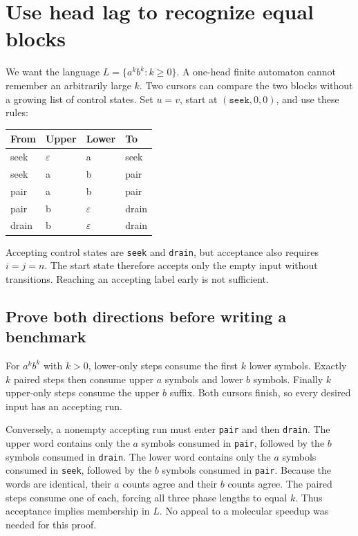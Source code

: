 \section{Use head lag to recognize equal blocks}
We want the language $L=\{a^k b^k:k\geq0\}$. A one-head finite automaton
cannot remember an arbitrarily large $k$. Two cursors can compare the two
blocks without a growing list of control states. Set $u=v$, start at
$(\texttt{seek},0,0)$, and use these rules:
\begin{center}
\begin{tabular}{llll}\toprule
From & Upper & Lower & To\\\midrule
seek & $\varepsilon$ & a & seek\\
seek & a & b & pair\\
pair & a & b & pair\\
pair & b & $\varepsilon$ & drain\\
drain & b & $\varepsilon$ & drain\\\bottomrule
\end{tabular}\end{center}
Accepting control states are \texttt{seek} and \texttt{drain}, but acceptance
also requires $i=j=n$. The start state therefore accepts only the empty input
without transitions. Reaching an accepting label early is not sufficient.


\subsection{Prove both directions before writing a benchmark}
For $a^k b^k$ with $k>0$, lower-only steps consume the first $k$ lower
symbols. Exactly $k$ paired steps then consume upper $a$ symbols and lower
$b$ symbols. Finally $k$ upper-only steps consume the upper $b$ suffix.
Both cursors finish, so every desired input has an accepting run.

Conversely, a nonempty accepting run must enter \texttt{pair} and then
\texttt{drain}. The upper word contains only the $a$ symbols consumed in
\texttt{pair}, followed by the $b$ symbols consumed in \texttt{drain}.
The lower word contains only the $a$ symbols consumed in \texttt{seek},
followed by the $b$ symbols consumed in \texttt{pair}. Because the words
are identical, their $a$ counts agree and their $b$ counts agree. The paired
steps consume one of each, forcing all three phase lengths to equal $k$.
Thus acceptance implies membership in $L$. No appeal to a molecular speedup
was needed for this proof.

